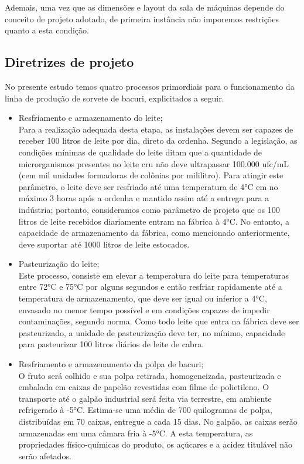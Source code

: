 \documentclass[10pt,a4paper]{article}
\begin{document}
Ademais, uma vez que as dimensões e layout da sala de máquinas depende do conceito de projeto adotado, de primeira instância não imporemos restrições quanto a esta condição.

\subsection{{ Diretrizes de projeto}}

\label{Diretrizes}
No presente estudo temos quatro processos primordiais para o funcionamento da linha de produção de sorvete de bacuri, explicitados a seguir.

\begin{itemize}
    \item Resfriamento e armazenamento do leite; \\
    Para a realização adequada desta etapa, as instalações devem ser capazes de receber 100 litros de leite por dia, direto da ordenha. Segundo a legislação, as condições mínimas de qualidade do leite ditam que a quantidade de microrganismos presentes no leite cru não deve ultrapassar 100.000 ufc/mL (cem mil unidades formadoras de colônias por mililitro). Para atingir este parâmetro, o leite deve ser resfriado até uma temperatura de 4°C em no máximo 3 horas após a ordenha e mantido assim até a entrega para a indústria; portanto, consideramos como parâmetro de projeto que os 100 litros de leite recebidos diariamente entram na fábrica à 4°C. No entanto, a capacidade de armazenamento da fábrica, como mencionado anteriormente, deve suportar até 1000 litros de leite estocados.
    \item Pasteurização do leite;\\
    Este processo, consiste em elevar a temperatura do leite para temperaturas entre 72°C  e 75°C por alguns segundos e então resfriar rapidamente até a temperatura de armazenamento, que deve ser igual ou inferior a 4°C, envasado no menor tempo possível e em condições capazes de impedir contaminações, segundo norma. Como todo leite que entra na fábrica deve ser pasteurizado, a unidade de pasteurização deve ter, no mínimo, capacidade para pasteurizar 100 litros diários de leite de cabra.
    \item Resfriamento e armazenamento da polpa de bacuri;\\
    O fruto será colhido e sua polpa retirada, homogeneizada, pasteurizada e embalada em caixas de papelão revestidas com filme de polietileno. O transporte até o galpão industrial será feita via terrestre, em ambiente refrigerado à -5°C. Estima-se uma média de 700 quilogramas de polpa, distribuídas em 70 caixas, entregue a cada 15 dias. No galpão, as caixas serão armazenadas em uma câmara fria à -5°C. A esta temperatura, as propriedades físico-químicas do produto, os açúcares e a acidez titulável não serão afetados.

\end{itemize}
\end{document}
